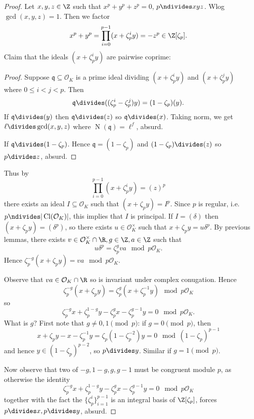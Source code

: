 \documentclass[a4paper]{article}
\renewcommand*{\O}{\mathcal{O}}
\DeclareMathOperator{\n}{N}
\DeclareMathOperator{\Cl}{Cl}%
\begin{document}
\begin{proof}
  Let \(x, y, z \in \Z\) such that \(x^p + y^p + z^p = 0\), \(p \ndivides xyz\). Wlog \(\gcd(x, y, z) = 1\). Then we factor
  \[
    x^p + y^p = \prod_{i = 0}^{p - 1} (x + \zeta_p^i y) = -z^p \in \Z[\zeta_p].
  \]
  Claim that the ideals \((x + \zeta_p^i y)\) are pairwise coprime:
  \begin{proof}
    Suppose \(\mathfrak q \subseteq \O_K\) is a prime ideal dividing \((x + \zeta_p^i y)\) and \((x + \zeta_p^j y)\) where \(0 \leq i < j < p\). Then
    \[
      \mathfrak q \divides ((\zeta_p^i - \zeta_p^j) y) = (1 - \zeta_p)(y).
    \]
    If \(\mathfrak q \divides (y)\) then \(\mathfrak q \divides (z)\) so \(\mathfrak q \divides (x)\). Taking norm, we get \(\ell \divides \gcd(x, y, z)\) where \(\n(\mathfrak q) = \ell^f\), absurd.

    If \(\mathfrak q \divides (1 - \zeta_p) \). Hence \(\mathfrak q = (1 - \zeta_p)\) and \((1 - \zeta_p) \divides (z)\) so \(p \divides z\), absurd.
  \end{proof}

  Thus by
  \[
    \prod_{i = 0}^{p - 1} (x + \zeta_p^i y) = (z)^p
  \]
  there exists an ideal \(I \subseteq \O_K\) such that \((x + \zeta_p y) = I^p\). Since \(p\) is regular, i.e.\ \(p \ndivides |\Cl(\O_K)|\), this implies that \(I\) is principal. If \(I = (\delta)\) then \((x + \zeta_py) = (\delta^p)\), so there exists \(u \in \O_K^\times\) such that \(x + \zeta_p y = u \delta^p\). By previous lemmas, there exists \(v \in \O_K^\times \cap \R, g \in \Z, a \in \Z\) such that
  \[
    u \delta^p = \zeta_p^g va \mod{p\O_K}.
  \]
  Hence \(\zeta_p^{-g} (x + \zeta_p y) = va \mod{p\O_K}\).

  Observe that \(va \in \O_K \cap \R\) so is invariant under complex conugation. Hence
  \[
    \zeta_p^{-g} (x + \zeta_p y) = \zeta_p^g (x + \zeta_p^{-1} y) \mod{p\O_K}
  \]
  so
  \[
    \zeta_p^{-g} x + \zeta_p^{1 - g} y - \zeta_p^g x - \zeta_p^{g - 1} y = 0 \mod{p\O_K}.
  \]
  What is \(g\)? First note that \(g \neq 0, 1 \pmod p\): if \(g = 0 \pmod p\), then
  \[
    x + \zeta_p y - x - \zeta_p^{-1} y = \zeta_p(1 - \zeta_p^{-2}) y = 0 \mod (1 - \zeta_p)^{p - 1}
  \]
  and hence \(y \in (1 - \zeta_p)^{p - 2}\), so \(p \divides y\). Similar if \(g = 1 \pmod p\).

  Now observe that two of \(-g, 1 - g, g, g - 1\) must be congruent module \(p\), as otherwise the identity
  \[
    \zeta_p^{-g} x + \zeta_p^{1 - g} y - \zeta_p^g x - \zeta_p^{g - 1} y = 0 \mod{p\O_K}
  \]
  together with the fact the \(\{\zeta_p^i\}_{i = 1}^{p - 1}\) is an integral basis of \(\Z[\zeta_p]\), forces \(p \divides x, p \divides y\), absurd.


\end{proof}
\end{document}
